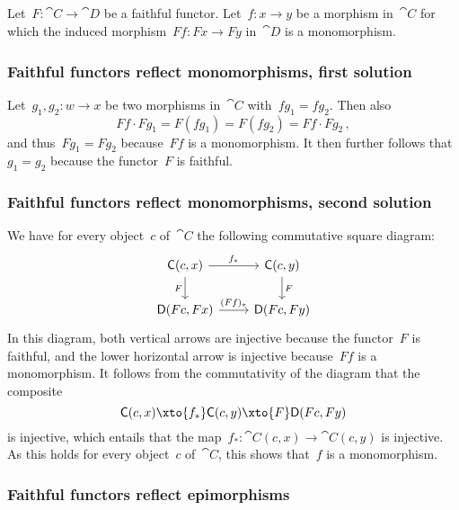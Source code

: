 \subsection{}

Let~$F \colon \cat{C} \to \cat{D}$ be a faithful functor.
Let~$f \colon x \to y$ be a morphism in~$\cat{C}$ for which the induced morphism~$F f \colon F x \to F y$ in~$\cat{D}$ is a monomorphism.



\subsubsection*{Faithful functors reflect monomorphisms, first solution}

Let~$g_1, g_2 \colon w \to x$ be two morphisms in~$\cat{C}$ with~$f g_1 = f g_2$.
Then also
\[
	F f ⋅ F g_1 = F (f g_1) = F (f g_2) = F f ⋅ F g_2 \,,
\]
and thus~$F g_1 = F g_2$ because~$F f$ is a monomorphism.
It then further follows that~$g_1 = g_2$ because the functor~$F$ is faithful.



\subsubsection*{Faithful functors reflect monomorphisms, second solution}

We have for every object~$c$ of~$\cat{C}$ the following commutative square diagram:
\[
	\begin{tikzcd}
		\cat{C}(c, x)
		\arrow{r}[above]{f_*}
		\arrow{d}[left]{F}
		&
		\cat{C}(c, y)
		\arrow{d}[right]{F}
		\\
		\cat{D}(F c, F x)
		\arrow{r}[above]{(F f)_*}
		&
		\cat{D}(F c, F y)
	\end{tikzcd}
\]
In this diagram, both vertical arrows are injective because the functor~$F$ is faithful, and the lower horizontal arrow is injective because~$F f$ is a monomorphism.
It follows from the commutativity of the diagram that the composite
\[
	\cat{C}(c, x)
	\xto{f_*}
	\cat{C}(c, y)
	\xto{F}
	\cat{D}(F c, F y)
\]
is injective, which entails that the map~$f_* \colon \cat{C}(c, x) \to \cat{C}(c, y)$ is injective.
As this holds for every object~$c$ of~$\cat{C}$, this shows that~$f$ is a monomorphism.



\subsubsection*{Faithful functors reflect epimorphisms}

